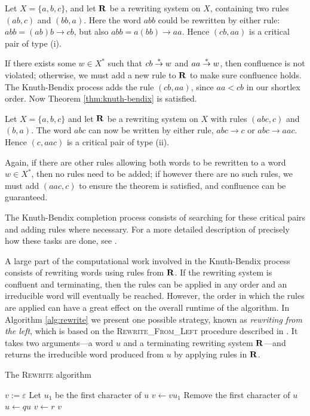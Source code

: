 \begin{example}
  Let $X=\{a,b,c\}$, and let $\mathbf{R}$ be a rewriting system on $X$, containing
  two rules $(ab, c)$ and $(bb, a)$.  Here the word $abb$ could be
  rewritten by either rule: $abb = (ab)b \to cb$, but also
  $abb = a(bb) \to aa$.  Hence $(cb, aa)$ is a critical pair of type (i).

  If there exists some $w \in X^*$ such that $cb \stackrel{*}{\to} w$ and $aa \stackrel{*}{\to} w$,
  then confluence is not violated; otherwise, we must add a new rule to $\mathbf{R}$
  to make sure confluence holds.  The Knuth-Bendix process adds the rule
  $(cb, aa)$, since $aa < cb$ in our shortlex order.  Now Theorem
  \ref{thm:knuth-bendix} is satisfied.
\end{example}

\begin{example}
  Let $X=\{a,b,c\}$ and let $\mathbf{R}$ be a rewriting system on $X$ with rules
  $(abc, c)$ and $(b, a)$.  The word $abc$ can now be written by either rule,
  $abc \to c$ or $abc \to aac$.  Hence $(c, aac)$ is a critical pair of type
  (ii).

  Again, if there are other rules allowing both words to be rewritten to a word
  $w \in X^*$, then no rules need to be added; if however there are no such
  rules, we must add $(aac, c)$ to ensure the theorem is satisfied, and
  confluence can be guaranteed.
\end{example}

The Knuth-Bendix completion process consists of searching for these critical
pairs and adding rules where necessary.  For a more detailed description of
precisely how these tasks are done, see \cite[\S 2.6]{sims}.

A large part of the computational work involved in the Knuth-Bendix process
consists of rewriting words using rules from $\mathbf{R}$.  If the rewriting system is
confluent and terminating, then the rules can be applied in any order and an
irreducible word will eventually be reached.  However, the order in which the
rules are applied can have a great effect on the overall runtime of the
algorithm.  In Algorithm \ref{alg:rewrite} we present one possible strategy,
known as \textit{rewriting from the left}, which is based on the
\textsc{Rewrite\_From\_Left} procedure described in \cite[\S 2.4]{sims}.  It
takes two arguments---a word $u$ and a terminating rewriting system
$\mathbf{R}$---and returns the irreducible word produced from $u$ by applying rules in
$\mathbf{R}$.

\begin{algorithm}
\caption{The \textsc{Rewrite} algorithm}
\label{alg:rewrite}
\begin{algorithmic}[1]
\State $v := \varepsilon$
  \State Let $u_1$ be the first character of $u$
  \State $v \gets v u_1$
  \State Remove the first character of $u$
      \State $u \gets qu$
      \State $v \gets r$
      \State \Break
    \EndIf
  \EndFor
\EndWhile
\State \Return $v$
\EndProcedure
\end{algorithmic}
\end{algorithm}

